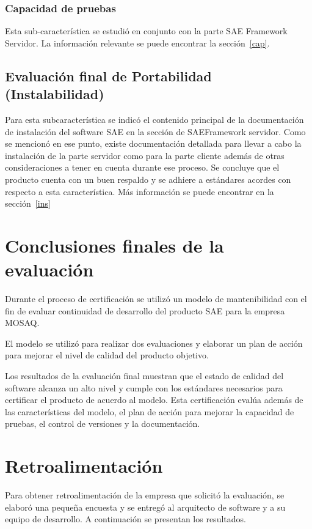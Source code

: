 \subsubsection{Capacidad de pruebas}

Esta sub-característica se estudió en conjunto con la parte SAE Framework 
Servidor. La información relevante se puede encontrar la sección~\ref{cap}.

\subsection{Evaluación final de Portabilidad (Instalabilidad)}

Para esta subcaracterística se indicó el contenido principal de la documentación de instalación
del software SAE en la sección de SAEFramework servidor. Como se mencionó en ese punto, existe
documentación detallada para llevar a cabo la instalación de la parte 
servidor como para la parte cliente además de otras consideraciones a tener en cuenta durante ese proceso.
Se concluye que el producto cuenta con un buen respaldo y se adhiere 
a estándares acordes con respecto a esta característica. Más información se puede encontrar en la sección~\ref{ins}

\section{Conclusiones finales de la evaluación}
Durante el proceso de certificación se utilizó un modelo de mantenibilidad 
con el fin de evaluar continuidad de desarrollo del producto SAE para la empresa MOSAQ.

El modelo se utilizó para realizar dos evaluaciones y elaborar un plan de acción para mejorar el nivel de calidad del producto objetivo.

Los resultados de la evaluación final muestran que el estado de calidad del 
software alcanza un alto nivel y cumple con los estándares necesarios para 
certificar el producto de acuerdo al modelo. Esta certificación evalúa
además de las características del modelo, el plan de 
acción para mejorar la capacidad de pruebas, el control de versiones y la documentación.

\section{Retroalimentación}

Para obtener retroalimentación de la empresa que solicitó la evaluación, se elaboró una
pequeña encuesta y se entregó al arquitecto de software y a su equipo de desarrollo.
A continuación se presentan los resultados.

